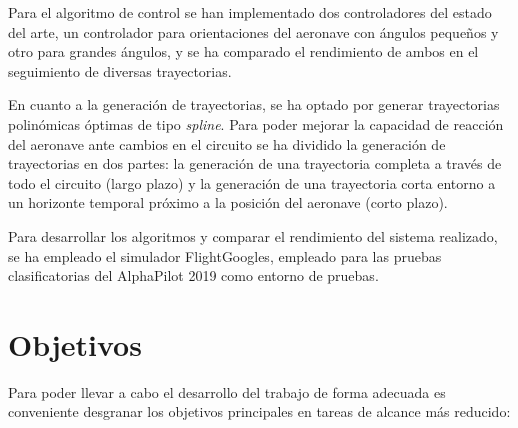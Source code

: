 Para el algoritmo de control se han implementado dos controladores del estado del arte, un controlador para orientaciones del aeronave con ángulos pequeños y otro para grandes ángulos, y se ha comparado el rendimiento de ambos en el seguimiento de diversas trayectorias.

En cuanto a la generación de trayectorias, se ha optado por generar trayectorias polinómicas óptimas de tipo \textit{spline}. Para poder mejorar la capacidad de reacción del aeronave ante cambios en el circuito se ha dividido la  generación de trayectorias en dos partes: la generación de una trayectoria completa a través de todo el circuito (largo plazo) y la generación de una trayectoria corta entorno a un horizonte temporal próximo a la posición del aeronave (corto plazo).

Para desarrollar los algoritmos y comparar el rendimiento del sistema realizado, se ha empleado el simulador FlightGoogles, empleado para las pruebas clasificatorias del AlphaPilot 2019 como entorno de pruebas.



\section{Objetivos}


Para poder llevar a cabo el desarrollo del trabajo de forma adecuada es conveniente desgranar los objetivos principales en tareas de alcance más reducido:

